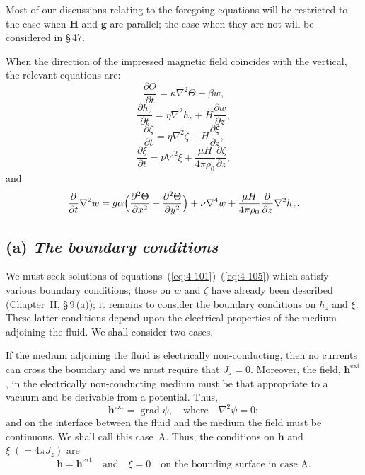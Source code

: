 Most of our discussions relating to the foregoing equations will be restricted to the case when $\mathbf{H}$ and $\mathbf{g}$ are parallel; the case when they are not will be considered in \S\,47.

When the direction of the impressed magnetic field coincides with the vertical, the relevant equations are:
\begin{equation}
\label{eq:4-101}
\frac{\partial\Theta}{\partial t} = \kappa\nabla^2\Theta+\beta w,
\end{equation}
\begin{equation}
\label{eq:4-102}
\frac{\partial h_z}{\partial t} = \eta\nabla^2 h_z + H\frac{\partial w}{\partial z},
\end{equation}
\begin{equation}
\label{eq:4-103}
\frac{\partial\zeta}{\partial t} = \eta\nabla^2\zeta + H\frac{\partial\xi}{\partial z},
\end{equation}
\begin{equation}
\label{eq:4-104}
\frac{\partial\xi}{\partial t} = \nu\nabla^2\xi + \frac{\mu H}{4\pi\rho_0}\frac{\partial\zeta}{\partial z},
\end{equation}
and
\begin{equation}
\label{eq:4-105}
\frac{\partial}{\partial t}\nabla^2 w = g\alpha\Bigl(\frac{\partial^2\Theta}{\partial x^2}+\frac{\partial^2\Theta}{\partial y^2}\Bigr)+\nu\nabla^4 w+\frac{\mu H}{4\pi\rho_0}\frac{\partial}{\partial z}\nabla^2 h_z.
\end{equation}

\subsection*{(a) \emph{The boundary conditions}}

We must seek solutions of equations~(\ref{eq:4-101})--(\ref{eq:4-105}) which satisfy various boundary conditions; those on $w$ and $\zeta$ have already been described (Chapter~II, \S\,9\,(a)); it remains to consider the boundary conditions on $h_z$ and $\xi$. These latter conditions depend upon the electrical properties of the medium adjoining the fluid. We shall consider two cases.

If the medium adjoining the fluid is electrically non-conducting, then no currents can cross the boundary and we must require that $J_z=0$. Moreover, the field, $\mathbf{h}^{\text{ext}}$, in the electrically non-conducting medium must be that appropriate to a vacuum and be derivable from a potential. Thus,
\begin{equation}
\label{eq:4-106}
\mathbf{h}^{\text{ext}} = \operatorname{grad}\psi, \quad \text{where}\quad \nabla^2\psi = 0;
\end{equation}
and on the interface between the fluid and the medium the field must be continuous. We shall call this case~A. Thus, the conditions on $\mathbf{h}$ and $\xi\;(=4\pi J_z)$ are
\begin{equation}
\label{eq:4-107}
\mathbf{h} = \mathbf{h}^{\text{ext}} \quad\text{and}\quad \xi = 0 \quad \text{on the bounding surface in case~A.}
\end{equation}

